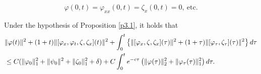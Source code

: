 \documentclass[10pt,a4paper]{amsart}
\begin{document}
	\begin{equation}\label{13.19}
		\varphi(0,t)=\varphi_{xx}(0,t)=\zeta_x(0,t)=0, ~\mbox{etc}.
	\end{equation}

	\begin{lemma}\label{l3.3}
	Under the hypothesis of Proposition \ref{p3.1}, it holds that
	\begin{align}\label{43}
			&\|\varphi(t)\|^2+(1+t)\|[\varphi_x,\varphi_t,\zeta,\zeta_x](t)\|^2+\int_{0}^{t}\left\{\|[\varphi_x,\zeta,\zeta_x](\tau)\|^2+(1+\tau)\|[\varphi_{\tau},\zeta_{\tau}](\tau)\|^2\right\}{\rm d}\tau\notag\\ 
			&\leq C(\|\varphi_0\|_1^2+\|\psi_0\|^2+\|\zeta_0\|_1^2+\delta)+C\int_{0}^{t}{\rm e}^{-c\tau}\left(\|\varphi(\tau)\|_2^2+\|\varphi_{\tau}(\tau)\|_1^2\right){\rm d}\tau.
		\end{align}
	\end{lemma}
\end{document}
